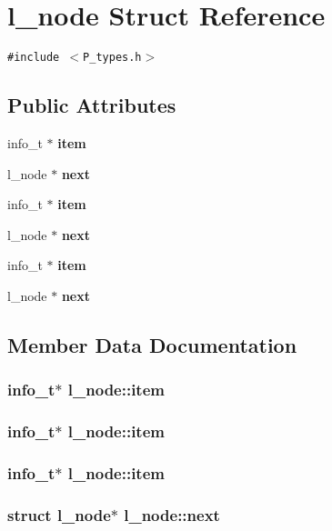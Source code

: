 \section{l\_\-node  Struct Reference}
\label{structl__node}
{\tt \#include $<$P\_\-types.h$>$}

\subsection*{Public Attributes}
\begin{CompactItemize}
\item 
info\_\-t $\ast$ {\bf item}
\item 
l\_\-node $\ast$ {\bf next}
\item 
info\_\-t $\ast$ {\bf item}
\item 
l\_\-node $\ast$ {\bf next}
\item 
info\_\-t $\ast$ {\bf item}
\item 
l\_\-node $\ast$ {\bf next}
\end{CompactItemize}


\subsection{Member Data Documentation}
\subsubsection{\setlength{\rightskip}{0pt plus 5cm}info\_\-t$\ast$ l\_\-node::item}\label{structl__node_m4}


\subsubsection{\setlength{\rightskip}{0pt plus 5cm}info\_\-t$\ast$ l\_\-node::item}\label{structl__node_m2}


\subsubsection{\setlength{\rightskip}{0pt plus 5cm}info\_\-t$\ast$ l\_\-node::item}\label{structl__node_m0}


\subsubsection{\setlength{\rightskip}{0pt plus 5cm}struct l\_\-node$\ast$ l\_\-node::next}\label{structl__node_m5}


